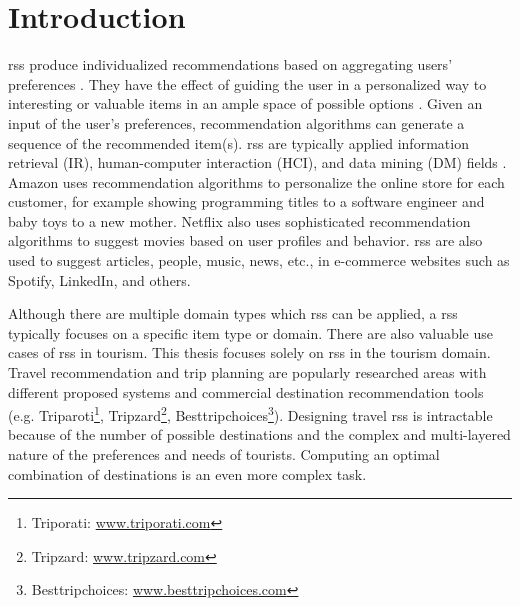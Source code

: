 


\chapter{Introduction}\label{chapter:introduction}
\Glspl{rs} produce individualized recommendations based on aggregating users' preferences \parencite{Ricci2011IntroductionHandbook}. They have the effect of guiding the user in a personalized way to interesting
or valuable items in an ample space of possible options \parencite{Burke2002HybridInteraction}. Given an input of the user’s preferences, recommendation algorithms can generate a sequence of the recommended item(s). \Glspl{rs} are typically applied information retrieval (IR), human-computer interaction (HCI), and data mining (DM) fields \parencite{Ricci2011IntroductionHandbook}. Amazon \parencite{Linden2003Amazon.comFiltering} uses recommendation algorithms to personalize the online store for each customer, for example showing programming titles to a software engineer and baby toys to a new mother. Netflix \parencite{Amatriain2013BigRecommendations} also uses sophisticated recommendation algorithms to suggest movies based on user profiles and behavior. \Glspl{rs} are also used to suggest articles, people, music, news, etc., in e-commerce websites such as Spotify, LinkedIn, and others.

Although there are multiple domain types which \glspl{rs} can be applied, a \glspl{rs} typically focuses on a specific item type or domain. There are also valuable use cases of \glspl{rs} in tourism. This thesis focuses solely on \glspl{rs} in the tourism domain. Travel recommendation and trip planning are popularly researched areas with different proposed systems \parencite{wolfgang_umap_recsystem, cbrecsys2014, Thiengburanathum2018AnTourists, Arif2020Blockchain-BasedSystem, Alrasheed2020ASystem} and commercial destination recommendation tools (e.g. Triparoti\footnote{Triporati: \url{www.triporati.com}}, Tripzard\footnote{Tripzard: \url{www.tripzard.com}}, Besttripchoices\footnote{Besttripchoices: \url{www.besttripchoices.com}}).
Designing travel \glspl{rs} is intractable because of the number of possible destinations and the complex
and multi-layered nature of the preferences and needs of tourists. Computing an optimal combination of destinations is an even more complex task. 

